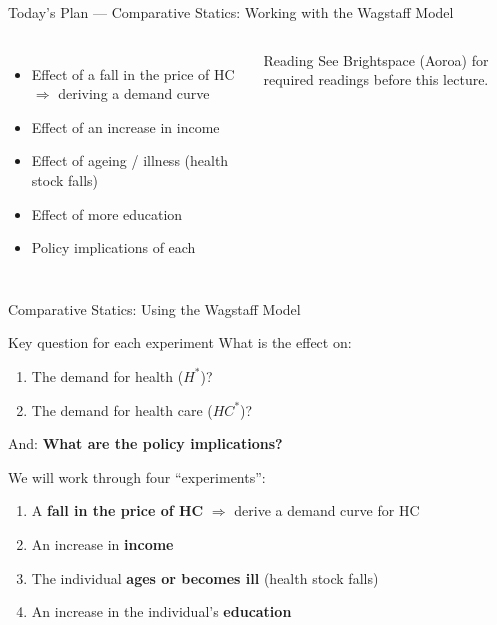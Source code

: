 \documentclass[aspectratio=169, 12pt]{beamer}
\newcommand{\planslide}[2]{%
  \begin{frame}{Today's Plan — #1}
    \begin{columns}
      \column{0.6\textwidth}
      \begin{itemize}#2\end{itemize}
      \column{0.38\textwidth}
      \begin{alertblock}{Reading}
        \footnotesize See Brightspace (Aoroa) for required readings before this lecture.
      \end{alertblock}
    \end{columns}
  \end{frame}}
\begin{document}
\planslide{Comparative Statics: Working with the Wagstaff Model}{
  \item Effect of a fall in the price of HC $\Rightarrow$ deriving a demand curve
  \item Effect of an increase in income
  \item Effect of ageing / illness (health stock falls)
  \item Effect of more education
  \item Policy implications of each
}

\begin{frame}{Comparative Statics: Using the Wagstaff Model}
  \begin{block}{Key question for each experiment}
    What is the effect on:
    \begin{enumerate}
      \item The demand for health ($H^*$)?
      \item The demand for health care ($HC^*$)?
    \end{enumerate}
    And: \textbf{What are the policy implications?}
  \end{block}
  \vspace{0.4em}
  We will work through four ``experiments'':
  \begin{enumerate}
    \item A \textbf{fall in the price of HC} $\Rightarrow$ derive a demand curve for HC
    \item An increase in \textbf{income}
    \item The individual \textbf{ages or becomes ill} (health stock falls)
    \item An increase in the individual's \textbf{education}
  \end{enumerate}
\end{frame}
\end{document}
